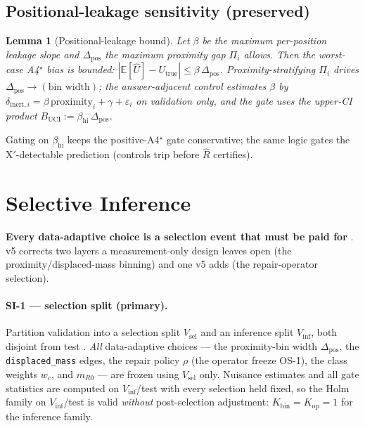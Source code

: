 \documentclass[11pt]{article}
\theoremstyle{plain}
\newtheorem{lemma}{Lemma}
\theoremstyle{definition}
\newcommand{\Uhat}{\widehat{U}}
\newcommand{\Rhat}{\widehat{R}}
\newcommand{\Pii}{\Pi_i}
\newcommand{\dpos}{\Delta_{\mathrm{pos}}}
\newcommand{\Eop}{\mathbb{E}}
\newcommand{\policy}{\rho}
\begin{document}
\subsection{Positional-leakage sensitivity (preserved)}\label{sec:theory:leakage}

\begin{lemma}[Positional-leakage bound]\label{lem:leakage}
Let $\beta$ be the maximum per-position leakage slope and $\dpos$ the maximum
proximity gap $\Pii$ allows. Then the worst-case A4$^\star$ bias is bounded:
$|\Eop[\Uhat]-U_{\mathrm{true}}|\le\beta\,\dpos$. Proximity-stratifying $\Pii$ drives
$\dpos\to(\text{bin width})$; the answer-adjacent control estimates $\beta$ by
$\delta_{\mathrm{inert},i}=\beta\,\mathrm{proximity}_i+\gamma+\varepsilon_i$ on
validation only, and the gate uses the upper-CI product
$B_{\mathrm{UCI}}:=\beta_{\mathrm{hi}}\,\dpos$.
\end{lemma}
\noindent Gating on $\beta_{\mathrm{hi}}$ keeps the positive-A4$^\star$ gate
conservative; the same logic gates the X$'$-detectable prediction (controls trip
before $\Rhat$ certifies).

\section{Selective Inference}\label{sec:si}

\textbf{Every data-adaptive choice is a selection event that must be paid for}
\cite{benjamini2009selective,berk2013validpostselection,fithian2014optimal}. v5
corrects two layers a measurement-only design leaves open (the proximity/displaced-mass
binning) and one v5 adds (the repair-operator selection).

\paragraph{SI-1 --- selection split (primary).} Partition validation into a
selection split $V_{\mathrm{sel}}$ and an inference split $V_{\mathrm{inf}}$, both
disjoint from test \cite{cox1975note}. \emph{All} data-adaptive choices --- the
proximity-bin width $\dpos$, the \texttt{displaced\_mass} edges, the repair policy
$\policy$ (the operator freeze OS-1), the class weights $w_c$, and $m_{R0}$ --- are
frozen using $V_{\mathrm{sel}}$ only. Nuisance estimates and all gate statistics are
computed on $V_{\mathrm{inf}}$/test with every selection held fixed, so the Holm
family on $V_{\mathrm{inf}}$/test is valid \emph{without} post-selection adjustment:
$K_{\mathrm{bin}}=K_{\mathrm{op}}=1$ for the inference family.
\end{document}
